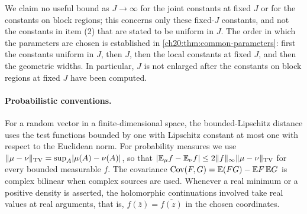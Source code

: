 We claim no useful bound as $J\to\infty$ for the joint constants at fixed $J$ or for the constants on block regions; this concerns only these fixed-$J$ constants, and not the constants in item (2) that are stated to be uniform in $J$. The order in which the parameters are chosen is established in \cref{ch20:thm:common-parameters}: first the constants uniform in $J$, then $J$, then the local constants at fixed $J$, and then the geometric widths. In particular, $J$ is not enlarged after the constants on block regions at fixed $J$ have been computed.

\paragraph{Probabilistic conventions.}
For a random vector in a finite-dimensional space, the bounded-Lipschitz distance uses the test functions bounded by one with Lipschitz constant at most one with respect to the Euclidean norm. For probability measures we use $\lVert \mu-\nu\rVert_{\operatorname{TV}}=\sup_A\lvert \mu(A)-\nu(A)\rvert$, so that $\lvert \mathbb E_\mu f-\mathbb E_\nu f\rvert\le2\lVert f\rVert_\infty\lVert \mu-\nu\rVert_{\operatorname{TV}}$ for every bounded measurable $f$. The covariance $\operatorname{Cov}(F,G)=\mathbb E(FG)-\mathbb E F\,\mathbb E G$ is complex bilinear when complex sources are used. Whenever a real minimum or a positive density is asserted, the holomorphic continuations involved take real values at real arguments, that is, $f(\overline z)=\overline{f(z)}$ in the chosen coordinates.
